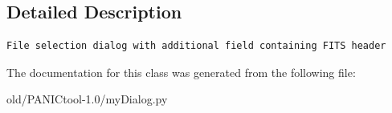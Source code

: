 \subsection{Detailed Description}


\footnotesize\begin{verbatim}File selection dialog with additional field containing FITS header\end{verbatim}
\normalsize
 



The documentation for this class was generated from the following file:\begin{CompactItemize}
\item 
old/PANICtool-1.0/my\-Dialog.py\end{CompactItemize}
